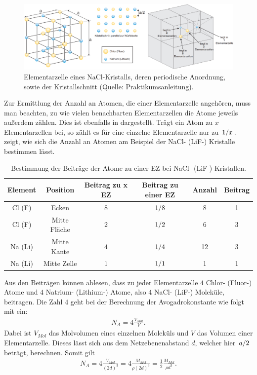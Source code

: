 \begin{figure}[H]
  \centering
  \includegraphics[width=\textwidth]{files/elementarzelle_nacl_reordered.png}
  \caption{Elementarzelle eines NaCl-Kristalls, deren periodische Anordnung, sowie der Kristallschnitt (Quelle: Praktikumsanleitung).}
  \label{fig:elementarzelle_nacl_reordered}
\end{figure}

Zur Ermittlung der Anzahl an Atomen, die einer Elementarzelle angehören, muss man beachten, zu wie vielen benachbarten Elementarzellen die Atome jeweils außerdem zählen. Dies ist ebenfalls in  dargestellt. Trägt ein Atom zu $x$ Elementarzellen bei, so zählt es für eine einzelne Elementarzelle nur zu $\flatfrac{1}{x}$.  zeigt, wie sich die Anzahl an Atomen am Beispiel der NaCl- (LiF-) Kristalle bestimmen lässt.

\begin{table}[H]
  \centering
  \caption{Bestimmung der Beiträge der Atome zu einer EZ bei  NaCl- (LiF-) Kristallen.}
  \vspace*{0.5em}
  \begin{tabular}{c|c|c|c||c|c}
    Element & Position & Beitrag zu x EZ & Beitrag zu einer EZ & Anzahl & Beitrag\\\hline
    Cl (F) & Ecken & $8$ & $\flatfrac{1}{8}$ & 8 & 1\\
    Cl (F) & Mitte Fläche & $2$ & $\flatfrac{1}{2}$ & 6 & 3\\
    Na (Li) & Mitte Kante & $4$ & $\flatfrac{1}{4}$ & 12 & 3\\
    Na (Li) & Mitte Zelle & $1$ & $\flatfrac{1}{1}$ & 1 & 1\\
  \end{tabular}
  \label{tab:best_atom_ez}
\end{table}

Aus den Beiträgen können ablesen, dass zu jeder Elementarzelle $4$ Chlor- (Fluor-) Atome und $4$ Natrium- (Lithium-) Atome, also $4$ NaCl- (LiF-) Moleküle, beitragen. Die Zahl $4$ geht bei der Berechnung der Avogadrokonstante wie folgt mit ein:
\begin{align}
  N_{A} = 4 \frac{V_{Mol}}{V}.
\end{align}
Dabei ist $V_{Mol}$ das Molvolumen eines einzelnen Moleküls und $V$ das Volumen einer Elementarzelle. Dieses lässt sich aus dem Netzebenenabstand $d$, welcher hier $\flatfrac{a}{2}$ beträgt, berechnen. Somit gilt
\begin{align}
  N_A = 4 \frac{V_{Mol}}{(2d)^3} = 4 \frac{M_{Mol}}{\rho (2d)^3} = \frac{1}{2}\frac{M_{Mol}}{\rho d^3}.\label{eq:avogadro}
\end{align}

